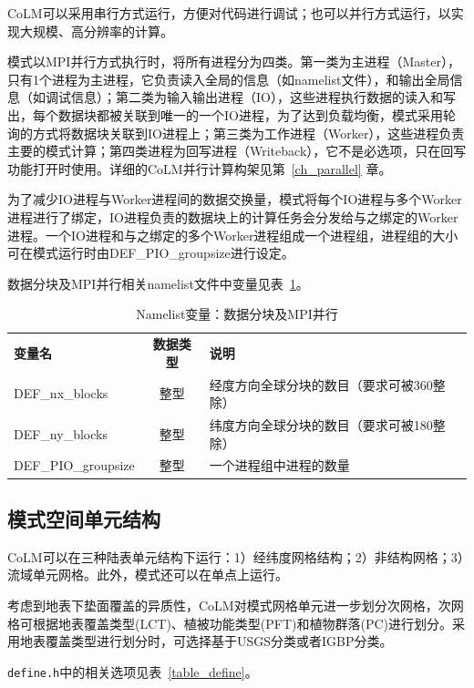 \documentclass[a4paper,12pt,twoside]{article}
\begin{document}
CoLM可以采用串行方式运行，方便对代码进行调试；也可以并行方式运行，以实现大规模、高分辨率的计算。

模式以MPI并行方式执行时，将所有进程分为四类。第一类为主进程（Master），只有1个进程为主进程，它负责读入全局的信息（如namelist文件），和输出全局信息（如调试信息）；第二类为输入输出进程（IO），这些进程执行数据的读入和写出，每个数据块都被关联到唯一的一个IO进程，为了达到负载均衡，模式采用轮询的方式将数据块关联到IO进程上；第三类为工作进程（Worker），这些进程负责主要的模式计算；第四类进程为回写进程（Writeback），它不是必选项，只在回写功能打开时使用。详细的CoLM并行计算构架见第~\ref{ch_parallel} 章。

为了减少IO进程与Worker进程间的数据交换量，模式将每个IO进程与多个Worker进程进行了绑定，IO进程负责的数据块上的计算任务会分发给与之绑定的Worker进程。一个IO进程和与之绑定的多个Worker进程组成一个进程组，进程组的大小可在模式运行时由DEF\_PIO\_groupsize进行设定。

数据分块及MPI并行相关namelist文件中变量见表~\ref{table_nl_blocks_mpi}。

\begin{table}[!htbp] \small
\caption{Namelist变量：数据分块及MPI并行} \label{table_nl_blocks_mpi}
\centering \renewcommand{\arraystretch}{1.5}
\begin{tabular}{lcl}
\toprule
\textbf{变量名} & \textbf{数据类型} & \textbf{说明} \\
DEF\_nx\_blocks & 整型 & 经度方向全球分块的数目（要求可被360整除）\\
DEF\_ny\_blocks & 整型 & 纬度方向全球分块的数目（要求可被180整除）\\
DEF\_PIO\_groupsize & 整型 & 一个进程组中进程的数量 \\
\bottomrule
\end{tabular} 
\end{table}

\subsection{模式空间单元结构}

CoLM可以在三种陆表单元结构下运行：1）经纬度网格结构；2）非结构网格；3）流域单元网格。此外，模式还可以在单点上运行。

考虑到地表下垫面覆盖的异质性，CoLM对模式网格单元进一步划分次网格，次网格可根据地表覆盖类型(LCT)、植被功能类型(PFT)和植物群落(PC)进行划分。采用地表覆盖类型进行划分时，可选择基于USGS分类或者IGBP分类。

\texttt{define.h}中的相关选项见表~\ref{table_define}。
\end{document}
